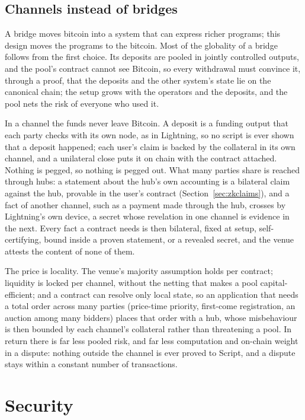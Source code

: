 \documentclass[11pt]{article}
\begin{document}
\subsection{Channels instead of bridges}
\label{sec:bridges}

A bridge moves bitcoin into a system that can express richer programs;
this design moves the programs to the bitcoin. Most of the globality of
a bridge follows from the first choice. Its deposits are pooled in
jointly controlled outputs, and the pool's contract cannot see Bitcoin,
so every withdrawal must convince it, through a proof, that the deposits
and the other system's state lie on the canonical chain; the setup grows
with the operators and the deposits, and the pool nets the risk of
everyone who used it.

In a channel the funds never leave Bitcoin. A deposit is a funding
output that each party checks with its own node, as in Lightning, so no
script is ever shown that a deposit happened; each user's claim is
backed by the collateral in its own channel, and a unilateral close
puts it on chain with the contract attached. Nothing is pegged, so
nothing is pegged out. What many parties share is reached through hubs:
a statement about the hub's own accounting is a bilateral claim against
the hub, provable in the user's contract (Section~\ref{sec:zkclaims}),
and a fact of another channel, such as a payment made through the hub,
crosses by Lightning's own device, a secret whose revelation in one
channel is evidence in the next. Every fact a contract needs is then
bilateral, fixed at setup, self-certifying, bound inside a proven
statement, or a revealed secret, and the venue attests the content of
none of them.

The price is locality. The venue's majority assumption holds per
contract; liquidity is locked per channel, without the netting that
makes a pool capital-efficient; and a contract can resolve only local
state, so an application that needs a total order across many parties
(price-time priority, first-come registration, an auction among many
bidders) places that order with a hub, whose misbehaviour is then
bounded by each channel's collateral rather than threatening a pool. In
return there is far less pooled risk, and far less computation and
on-chain weight in a dispute: nothing outside the channel is ever
proved to Script, and a dispute stays within a constant number of
transactions.

\section{Security}
\label{sec:security}
\end{document}
